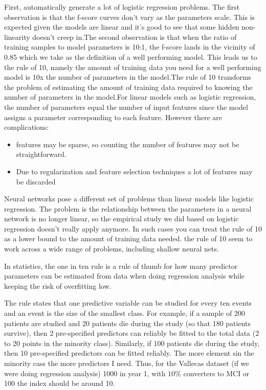 \documentclass[preprint,12pt]{elsarticle}
\begin{document}
First, automatically generate a lot of logistic regression problems. The first observation is that the f-score curves don’t vary as the parameters scale. This is expected given the models are linear and it’s good to see that some hidden non-linearity doesn’t creep in.The second observation is that when the ratio of training samples to model parameters is 10:1, the f-score lands in the vicinity of 0.85 which we take as the definition of a well performing model.
This leads us to the rule of 10, namely the amount of training data you need for a well performing model is 10x the number of parameters in the model.The rule of 10 transforms the problem of estimating the amount of training data required to knowing the number of parameters in the model.For linear models such as logistic regression, the number of parameters equal the number of input features since the model assigns a parameter corresponding to each feature. However there are complications:
\begin{itemize}
	\item features may be sparse, so counting the number of features may not be straightforward.
	\item Due to regularization and feature selection techniques a lot of features may be discarded
\end{itemize}

Neural networks pose a different set of problems than linear models like logistic regression. The problem is the relationship between the parameters in a neural network is no longer linear, so the empirical study we did based on logistic regression doesn’t really apply anymore. In such cases you can treat the rule of 10 as a lower bound to the amount of training data needed.
the rule of 10 seem to work across a wide range of problems, including shallow neural nets. 

In statistics, the one in ten rule is a rule of thumb for how many predictor parameters can be estimated from data when doing regression analysis while keeping the risk of overfitting low. 

The rule states that one predictive variable can be studied for every ten events and an event is the size of the smallest class. For example, if a sample of 200 patients are studied and 20 patients die during the study (so that 180 patients survive), then 2 pre-specified predictors can reliably be fitted to the total data (2 to 20 points in the minority class). Similarly, if 100 patients die during the study, then 10  pre-specified predictors can be fitted reliably. The more element sin the minority cass the more predictors I need. Thus, for the Vallecas dataset (if we were doing regression analysis) 1000 in year 1, with $10\%$ converters to MCI or 100 the index should be around 10.
\end{document}
